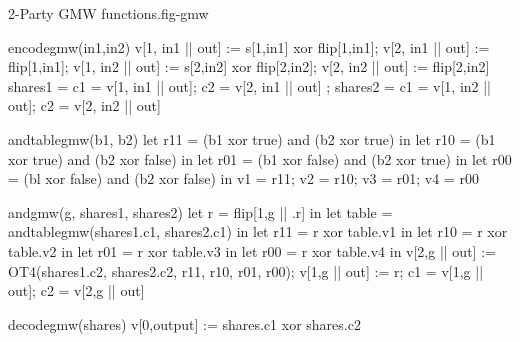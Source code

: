 \begin{fpfig}[t]{2-Party GMW functions.}{fig-gmw}
{\footnotesize
  \begin{verbatimtab}
    encodegmw(in1,in2)
    {
      v[1, in1 || out] := s[1,in1] xor flip[1,in1];
      v[2, in1 || out] := flip[1,in1];
      v[1, in2 || out] := s[2,in2] xor flip[2,in2];
      v[2, in2 || out] := flip[2,in2]
      { shares1 = { c1 = v[1, in1 || out]; c2 = v[2, in1 || out] };
        shares2 = { c1 = v[1, in2 || out]; c2 = v[2, in2 || out]} } 
    }
    
    andtablegmw(b1, b2)
    {
      let r11 = (b1 xor true) and (b2 xor true) in
      let r10 = (b1 xor true) and (b2 xor false) in
      let r01 = (b1 xor false) and (b2 xor true) in
      let r00 = (bl xor false) and (b2 xor false) in
      { v1 = r11; v2 = r10; v3 = r01; v4 = r00 }
    }
    
    andgmw(g, shares1, shares2)
    {
      let r = flip[1,g || .r] in
      let table = andtablegmw(shares1.c1, shares2.c1) in
      let r11 =  r xor table.v1 in
      let r10 =  r xor table.v2 in
      let r01 =  r xor table.v3 in
      let r00 =  r xor table.v4 in
      v[2,g || out] := OT4(shares1.c2, shares2.c2, r11, r10, r01, r00);
      v[1,g || out] := r;
      { c1 = v[1,g || out]; c2 = v[2,g || out]}
    }
    
    decodegmw(shares)
    {
      v[0,output] := shares.c1 xor shares.c2
    }
  \end{verbatimtab}
}
\end{fpfig}
